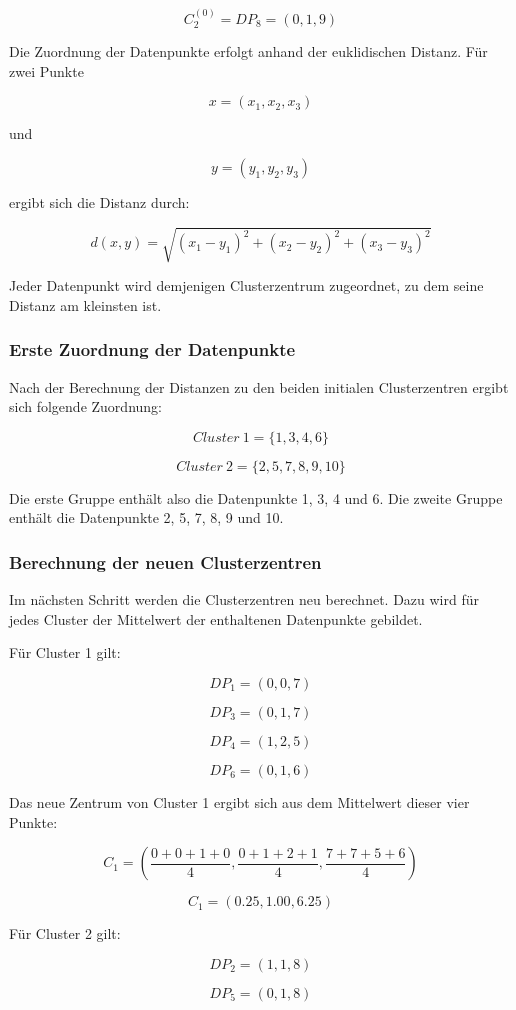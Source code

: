 \documentclass[12pt,a4paper]{article}
\begin{document}
\[
C_2^{(0)} = DP_8 = (0,1,9)
\]

Die Zuordnung der Datenpunkte erfolgt anhand der euklidischen Distanz. Für zwei Punkte

\[
x = (x_1,x_2,x_3)
\]

und

\[
y = (y_1,y_2,y_3)
\]

ergibt sich die Distanz durch:

\[
d(x,y) = \sqrt{(x_1-y_1)^2 + (x_2-y_2)^2 + (x_3-y_3)^2}
\]

Jeder Datenpunkt wird demjenigen Clusterzentrum zugeordnet, zu dem seine Distanz am kleinsten ist.

\subsubsection{Erste Zuordnung der Datenpunkte}

Nach der Berechnung der Distanzen zu den beiden initialen Clusterzentren ergibt sich folgende Zuordnung:

\[
Cluster\ 1 = \{1,3,4,6\}
\]

\[
Cluster\ 2 = \{2,5,7,8,9,10\}
\]

Die erste Gruppe enthält also die Datenpunkte 1, 3, 4 und 6. Die zweite Gruppe enthält die Datenpunkte 2, 5, 7, 8, 9 und 10.

\subsubsection{Berechnung der neuen Clusterzentren}

Im nächsten Schritt werden die Clusterzentren neu berechnet. Dazu wird für jedes Cluster der Mittelwert der enthaltenen Datenpunkte gebildet.

Für Cluster 1 gilt:

\[
DP_1 = (0,0,7)
\]

\[
DP_3 = (0,1,7)
\]

\[
DP_4 = (1,2,5)
\]

\[
DP_6 = (0,1,6)
\]

Das neue Zentrum von Cluster 1 ergibt sich aus dem Mittelwert dieser vier Punkte:

\[
C_1 = 
\left(
\frac{0+0+1+0}{4},
\frac{0+1+2+1}{4},
\frac{7+7+5+6}{4}
\right)
\]

\[
C_1 = (0.25, 1.00, 6.25)
\]

Für Cluster 2 gilt:

\[
DP_2 = (1,1,8)
\]

\[
DP_5 = (0,1,8)
\]
\end{document}
